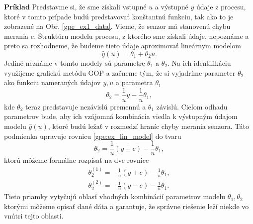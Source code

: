\textbf{Príklad}
\newline
Predstavme si, že sme získali vstupné $ u $ a výstupné $ y $ údaje z procesu, ktoré v tomto prípade budú predstavovať konštantnú funkciu, tak ako to je zobrazené na Obr. \ref{gpe_ex1_data}. Vieme, že senzor má stanovenú chybu merania $ e $. Štruktúru modelu procesu, z ktorého sme získali údaje, nepoznáme a preto sa rozhodneme, že budeme tieto údaje aproximovať lineárnym modelom
\begin{equation}
	\hat{y}(u) = \theta_1 + \theta_2u.
\end{equation}
 Jediné neznáme v tomto modely sú parametre $ \theta_1 $ a $ \theta_2 $. Na ich identifikáciu využijeme grafickú metódu GOP a začneme tým, že si vyjadríme parameter $ \theta_2 $ ako funkciu nameraných údajov $ y, u $ a parametra $ \theta_1 $
\begin{equation} \label{gpe:ex_lin_model}
	\theta_2 = \frac{1}{u}y - \frac{1}{u}\theta_1,
\end{equation}
kde $ \theta_2 $ teraz predstavuje nezávislú premennú a $ \theta_1 $ závislú. Cieľom odhadu parametrov bude, aby ich vzájomná kombinácia viedla k výstupným údajom modelu $ \hat{y}(u) $, ktoré budú ležať v rozmedzí hraníc chyby merania senzora. Táto podmienka upravuje rovnicu \ref{gpe:ex_lin_model} do tvaru
\begin{equation} 
	\theta_2 = \frac{1}{u}\left(y \pm e\right) - \frac{1}{u}\theta_1,
\end{equation}
ktorú môžeme formálne rozpísať na dve rovnice 
\begin{equation}
	\begin{split}
		\theta_2^{(1)} =& \frac{1}{u}\left(y + e\right) - \frac{1}{u}\theta_1,\\
		\theta_2^{(2)} =& \frac{1}{u}\left(y - e\right) - \frac{1}{u}\theta_1.
	\end{split} 
\end{equation}
Tieto priamky vytyčujú oblasť vhodných kombinácií parametrov modelu $ \theta_1, \theta_2 $ ktorými môžeme opísať dané dáta a garantuje, že správne riešenie leží niekde vo vnútri tejto oblasti.

